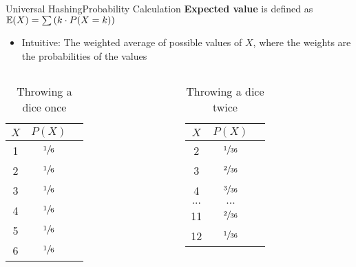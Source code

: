 \begin{frame}{Universal Hashing}{Probability Calculation}
  \textbf{Expected value} is defined as  {\color{Mittel-Blau}$\mathbb{E}(X)  = \sum \left(k \cdot P(X = k)\right)$}
  \vspace*{0em}
  \begin{itemize}
    \item <2->
      Intuitive: The weighted average of possible values of {\color{Mittel-Blau}$X$}, where
      the weights are the probabilities of the values
  \end{itemize}
  \vspace*{-1.0em}
 \begin{columns}
   \begin{column}{0.5\linewidth}
     \begin{table}[!h]
       \small{
     \caption{Throwing a dice once}
    \label{tab:probabilities:value_rolling_dice_once}
    \begin{tabularx}{0.25\linewidth}{c|cc}
      {\color{Mittel-Blau}$X$} & {\color{Mittel-Blau}$P(X)$}\\
      \midrule
      1 & $\sfrac{1}{6}$\\
      2 & $\sfrac{1}{6}$\\
      3 & $\sfrac{1}{6}$\\
      4 & $\sfrac{1}{6}$\\
      5 & $\sfrac{1}{6}$\\
      6 & $\sfrac{1}{6}$\\
    \end{tabularx}}
  \end{table}  
   \end{column}
   \begin{column}{0.5\linewidth}
     \begin{table}[!h]
       \small{
    \caption{Throwing a dice twice}
    \label{tab:probabilities:value_rolling_dice_twice}
    \begin{tabularx}{0.275\linewidth}{c|cc}
      {\color{Mittel-Blau}$X$ }&{\color{Mittel-Blau} $P(X)$}\\
      \midrule
      2 & $\sfrac{1}{36}$\\
      3 & $\sfrac{2}{36}$\\
      4 & $\sfrac{3}{36}$\\
      $\dots$ & $\dots$\\
      11 & $\sfrac{2}{36}$\\
      12 & $\sfrac{1}{36}$\\
    \end{tabularx}}

\end{table}
\end{column}
\end{columns}
\end{frame}
